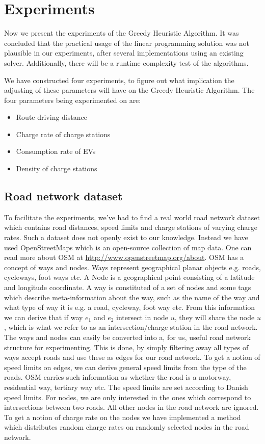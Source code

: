 \section{Experiments}
\label{sec:experiments}
Now we present the experiments of the Greedy Heuristic Algorithm. It was concluded that the practical usage of the linear programming solution was not plausible in our experiments, after several implementations using an existing solver. Additionally, there will be a runtime complexity test of the algorithms.

We have constructed four experiments, to figure out what implication the adjusting of these parameters will have on the Greedy Heuristic Algorithm. The four parameters being experimented on are:
\begin{itemize}
     \item Route driving distance
     \item Charge rate of charge stations
     \item Consumption rate of EVs
     \item Density of charge stations
 \end{itemize} 



\subsection{Road network dataset} 
\label{sub:setup}
To facilitate the experiments, we've had to find a real world road network dataset which contains road distances, speed limits and charge stations of varying charge rates. Such a dataset does not openly exist to our knowledge. Instead we have used OpenStreetMaps which is an open-source collection of map data. One can read more about OSM at \url{http://www.openstreetmap.org/about}. OSM has a concept of ways and nodes. Ways represent geographical planar objects e.g. roads, cycleways, foot ways etc. A Node is a geographical point consisting of a latitude and longitude coordinate. A way is constituted of a set of nodes and some tags which describe meta-information about the way, such as the name of the way and what type of way it is e.g. a road, cycleway, foot way  etc. From this information we can derive that if way $e_1$ and $e_2$ intersect in node $u$, they will share the node $u$, which is what we refer to as an intersection/charge station in the road network.\\

The ways and nodes can easily be converted into a, for us, useful road network structure for experimenting. This is done, by simply filtering away all types of ways accept roads and use these as edges for our road network. To get a notion of speed limits on edges, we can derive general speed limits from the type of the roads. OSM carries such information as whether the road is a motorway, residential way, tertiary way etc. The speed limits are set according to Danish speed limits. For nodes, we are only interested in the ones which correspond to intersections between two roads. All other nodes in the road network are ignored. To get a notion of charge rate on the nodes we have implemented a method which distributes random charge rates on randomly selected nodes in the road network.

